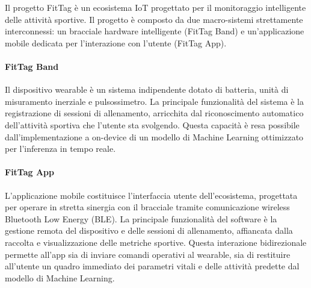 Il progetto FitTag è un ecosistema IoT progettato per il monitoraggio intelligente delle attività sportive.
Il progetto è composto da due macro-sistemi strettamente interconnessi: un bracciale hardware intelligente (FitTag Band) e un'applicazione mobile dedicata per l'interazione con l'utente (FitTag App).

\paragraph{FitTag Band}
Il dispositivo wearable è un sistema indipendente dotato di batteria, unità di misuramento inerziale e pulsossimetro.
La principale funzionalità del sistema è la registrazione di sessioni di allenamento, arricchita dal riconoscimento automatico dell'attività sportiva che l'utente sta svolgendo.
Questa capacità è resa possibile dall'implementazione a on-device di un modello di Machine Learning ottimizzato per l'inferenza in tempo reale.

\paragraph{FitTag App}
L'applicazione mobile costituisce l'interfaccia utente dell'ecosistema, progettata per operare in stretta sinergia con il bracciale tramite comunicazione wireless Bluetooth Low Energy (BLE).
La principale funzionalità del software è la gestione remota del dispositivo e delle sessioni di allenamento, affiancata dalla raccolta e visualizzazione delle metriche sportive.
Questa interazione bidirezionale permette all'app sia di inviare comandi operativi al wearable, sia di restituire all'utente un quadro immediato dei parametri vitali e delle attività predette dal modello di Machine Learning.